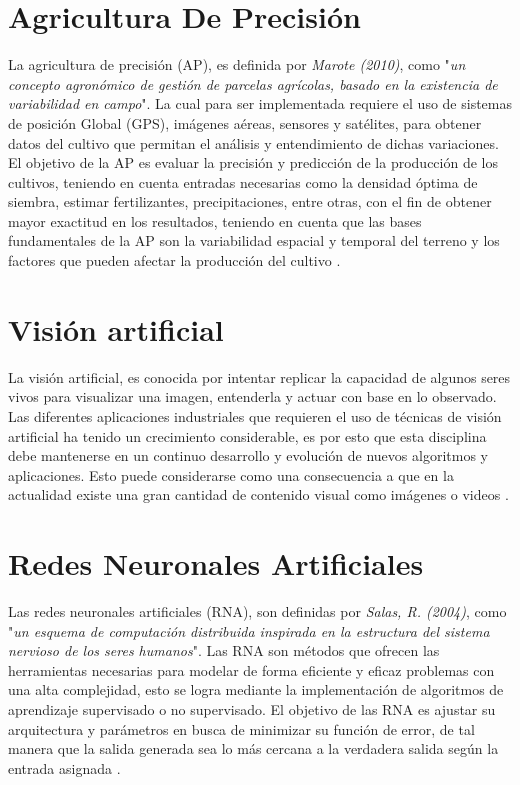 \section{Agricultura De Precisión} La agricultura de precisión (AP), es definida por \textit{Marote (2010)}, como "\textit{un concepto agronómico de gestión de parcelas agrícolas, basado en la existencia de variabilidad en campo}". La cual para ser implementada requiere el uso de sistemas de posición Global (GPS), imágenes aéreas, sensores y satélites, para obtener datos del cultivo que permitan el análisis y entendimiento de dichas variaciones. El objetivo de la AP es evaluar la precisión y predicción de la producción de los cultivos, teniendo en cuenta entradas necesarias como la densidad óptima de siembra, estimar fertilizantes, precipitaciones, entre otras, con el fin de obtener mayor exactitud en los resultados, teniendo en cuenta que las bases fundamentales de la AP son la variabilidad espacial y temporal del terreno y los factores que pueden afectar la producción del cultivo \cite{agricultura}. 


\section{Visión artificial} La visión artificial, es conocida por intentar replicar la capacidad de algunos seres vivos para visualizar una imagen, entenderla y actuar con base en lo observado. Las diferentes aplicaciones industriales que requieren el uso de técnicas de visión artificial ha tenido un crecimiento considerable, es por esto que esta disciplina debe mantenerse en un continuo  desarrollo y evolución de nuevos algoritmos y aplicaciones. Esto puede considerarse como una consecuencia a que en la actualidad existe una gran cantidad de contenido visual como imágenes o videos \cite{ref_15}.


\section{Redes Neuronales Artificiales} Las redes neuronales artificiales (RNA), son definidas por \textit{Salas, R. (2004)}, como "\textit{un esquema de computación distribuida inspirada en la	estructura del sistema nervioso de los seres humanos}". Las RNA son métodos que ofrecen las herramientas necesarias para modelar de forma eficiente y eficaz problemas con una alta complejidad, esto se logra mediante la implementación de algoritmos de aprendizaje supervisado o no supervisado. El objetivo de las RNA es ajustar su arquitectura y parámetros en busca de minimizar su función de error, de tal manera que la salida generada sea lo más cercana a la verdadera salida según la entrada asignada \cite{redes}.

